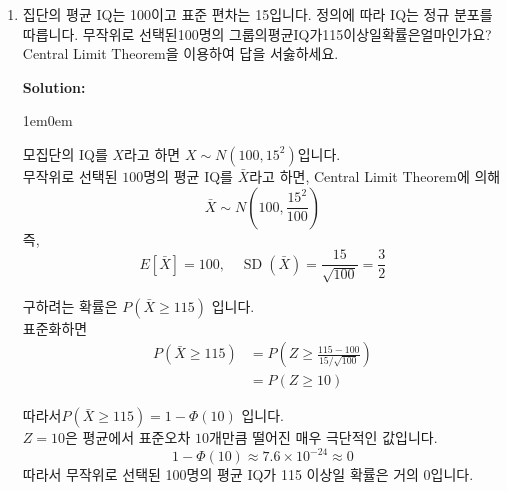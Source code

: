 \documentclass{article}
\newenvironment{solution}
{
    \par\medskip
    \noindent\textbf{Solution:}
    \begin{adjustwidth}{1em}{0em}
}
{
    \end{adjustwidth}
    \medskip
}
\begin{document}
\begin{enumerate}[label=\textbf{\arabic*.}, leftmargin=*]
\begin{solution}
\begin{enumerate}[label=(\alph*), leftmargin=2em, itemsep=1em]
            $\operatorname{Cor}(X,Y)$\\
            상관계수를 위해 분산을 구하면
            \begin{align*}
                \operatorname{Var}(X)&=E[X^2]-(E[X])^2=\frac{11}{30}-\left(\frac{8}{15}\right)^2=\frac{37}{450}\\
                \operatorname{Var}(Y)&=E[Y^2]-(E[Y])^2=\frac{28}{15}-\left(\frac{19}{15}\right)^2=\frac{59}{225} \\
                \\
                \operatorname{Cor}(X,Y)&=\frac{\operatorname{Cov}(X,Y)}{\sqrt{\operatorname{Var}(X)\operatorname{Var}(Y)}}\\
                \operatorname{Cor}(X,Y)&=\frac{-\frac{2}{225}}{\sqrt{\frac{37}{450}\cdot\frac{59}{225}}}=-\frac{2\sqrt2}{\sqrt{2183}}
            \end{align*}       
            
        \end{enumerate}
    \end{solution}

\item 집단의 평균 IQ는 100이고 표준 편차는 15입니다. 정의에 따라 IQ는 정규 분포를 따릅니다. 무작위로 선택된100명의 그룹의평균IQ가115이상일확률은얼마인가요?Central Limit Theorem을 이용하여 답을 서숧하세요.

    \begin{solution}
        모집단의 IQ를 $X$라고 하면 $X\sim N(100,15^2)$입니다.  \\
        무작위로 선택된 $100$명의 평균 IQ를 $\bar X$라고 하면, Central Limit Theorem에 의해  
        $$  
        \bar X\sim N\left(100,\frac{15^2}{100}\right)  
        $$  
        즉,  
        $$  
        E[\bar X]=100,\quad \operatorname{SD}(\bar X)=\frac{15}{\sqrt{100}}=\frac32  
        $$  
         
        구하려는 확률은 $P(\bar X\ge 115)$ 입니다.  \\
        표준화하면  
        \begin{align*}
            P(\bar X\ge 115)&=P\left(Z\ge \frac{115-100}{15/\sqrt{100}}\right)\\  
            &=P(Z\ge 10)
        \end{align*}
    
        따라서$P(\bar X\ge 115)=1-\Phi(10)$ 입니다.\\  
        $Z=10$은 평균에서 표준오차 $10$개만큼 떨어진 매우 극단적인 값입니다. 
        $$  
        1-\Phi(10)\approx 7.6\times 10^{−24}\approx 0  
        $$  
        따라서 무작위로 선택된 100명의 평균 IQ가 115 이상일 확률은 거의 0입니다.  
    \end{solution}


\end{enumerate}
\end{document}
